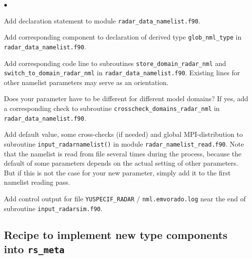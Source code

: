 \documentclass[10pt,a4paper,twoside,headinclude,footinclude,parskip=half]{scrartcl}
\newcommand{\myaktuellesection}{sec:intro}%
\newcommand{\labelsec}[1]{\label{#1}\renewcommand{\myaktuellesection}{#1}}%
\newcommand{\labelsec}[1]{\label{#1}}%
\newlength{\tmplena}%
\newenvironment{aufzaehlung}%
{\begin{list}{$\bullet$}{%
      \setlength{\labelwidth}{8mm}%
      \setlength{\leftmargin}{\labelwidth*\real{0.5}}%
      \setlength{\tmplena}{\itemsep}%
      \setlength{\itemsep}{0mm}%
}}{\setlength{\itemsep}{\tmplena}\end{list}}%
\newcommand{\srcform}[1]{\mbox{\texttt{#1}}\xspace}%
\begin{document}
\begin{aufzaehlung}
\item Add declaration statement to module \srcform{radar_data_namelist.f90}.
\item Add corresponding component to declaration of derived type \srcform{glob_nml_type} in \srcform{radar_data_namelist.f90}.
\item Add corresponding code line to subroutines \srcform{store_domain_radar_nml} and \srcform{switch_to_domain_radar_nml} in \srcform{radar_data_namelist.f90}. Existing lines for other namelist parameters may serve as an orientation.
\item Does your parameter have to be different for different model domains? If yes, add a corresponding
check to subroutine \srcform{crosscheck_domains_radar_nml} in \srcform{radar_data_namelist.f90}.
\item Add default value, some cross-checks (if needed) and global MPI-distribution to subroutine \srcform{input_radarnamelist()} in module \srcform{radar_namelist_read.f90}. Note that the namelist is read from file several times
during the process, because the default of some parameters depends on the actual setting of other parameters. But if this
is not the case for your new parameter, simply add it to the first namelist reading pass.
\item Add control output for file \srcform{YUSPECIF_RADAR} / \srcform{nml.emvorado.log} near the end of subroutine \srcform{input_radarsim.f90}.
\end{aufzaehlung}

\subsection{Recipe to implement new type components into \srcform{rs_meta} }

\labelsec{sec:devel:newtypers}
\end{document}
